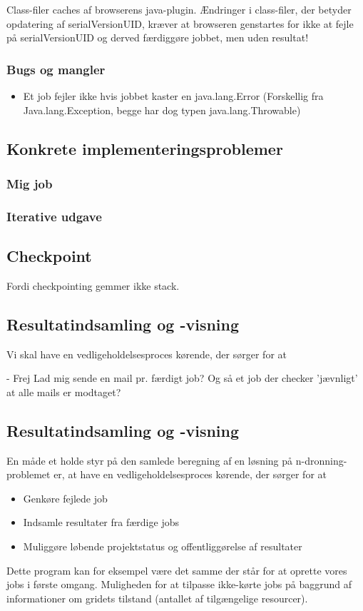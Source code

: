 \documentclass[a4,10pt]{article}
\begin{document}
Class-filer caches af browserens java-plugin. Ændringer i class-filer, der betyder opdatering af serialVersionUID, kræver at browseren genstartes for ikke at fejle på serialVersionUID og derved færdiggøre jobbet, men uden resultat! 

\subsubsection{Bugs og mangler}
\begin{itemize}
	\item Et job fejler ikke hvis jobbet kaster en java.lang.Error (Forskellig fra Java.lang.Exception, begge har dog typen java.lang.Throwable)
\end{itemize}


\subsection{Konkrete implementeringsproblemer}
\subsubsection{Mig job}\label{label}
\subsubsection{Iterative udgave}
\subsection{Checkpoint}

Fordi checkpointing gemmer ikke stack.


\subsection{Resultatindsamling og -visning}
Vi skal have en vedligeholdelsesproces kørende, der sørger for at 

- Frej Lad mig sende en mail pr. færdigt job? Og så et job der checker 'jævnligt' at alle mails er modtaget?


\subsection{Resultatindsamling og -visning}
En måde et holde styr på den samlede beregning af en løsning på n-dronning-problemet er, at have en vedligeholdelsesproces kørende, der sørger for at 
\begin{itemize}
	\item Genkøre fejlede job
	\item Indsamle resultater fra færdige jobs
	\item Muliggøre løbende projektstatus og offentliggørelse af resultater 
\end{itemize}
Dette program kan for eksempel være det samme der står for at oprette vores jobs i første omgang. Muligheden for at tilpasse ikke-kørte jobs på baggrund af informationer om gridets tilstand (antallet af tilgængelige resourcer). 
\end{document}

